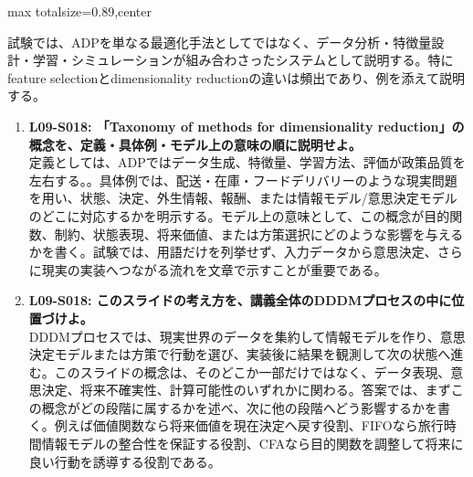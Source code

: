 \begin{minipage}[t]{0.58\textwidth}
\begin{adjustbox}{max totalsize={\textwidth}{0.89\textheight},center}
\begin{minipage}{\textwidth}
試験では、ADPを単なる最適化手法としてではなく、データ分析・特徴量設計・学習・シミュレーションが組み合わさったシステムとして説明する。特にfeature selectionとdimensionality reductionの違いは頻出であり、例を添えて説明する。\par{}\begin{enumerate}\item \textbf{L09-S018: 「Taxonomy of methods for dimensionality reduction」の概念を、定義・具体例・モデル上の意味の順に説明せよ。}\\定義としては、ADPではデータ生成、特徴量、学習方法、評価が政策品質を左右する。。具体例では、配送・在庫・フードデリバリーのような現実問題を用い、状態、決定、外生情報、報酬、または情報モデル/意思決定モデルのどこに対応するかを明示する。モデル上の意味として、この概念が目的関数、制約、状態表現、将来価値、または方策選択にどのような影響を与えるかを書く。試験では、用語だけを列挙せず、入力データから意思決定、さらに現実の実装へつながる流れを文章で示すことが重要である。\item \textbf{L09-S018: このスライドの考え方を、講義全体のDDDMプロセスの中に位置づけよ。}\\DDDMプロセスでは、現実世界のデータを集約して情報モデルを作り、意思決定モデルまたは方策で行動を選び、実装後に結果を観測して次の状態へ進む。このスライドの概念は、そのどこか一部だけではなく、データ表現、意思決定、将来不確実性、計算可能性のいずれかに関わる。答案では、まずこの概念がどの段階に属するかを述べ、次に他の段階へどう影響するかを書く。例えば価値関数なら将来価値を現在決定へ戻す役割、FIFOなら旅行時間情報モデルの整合性を保証する役割、CFAなら目的関数を調整して将来に良い行動を誘導する役割である。\end{enumerate}
\end{minipage}
\end{adjustbox}
\end{minipage}


